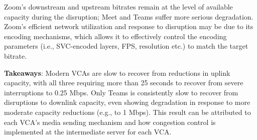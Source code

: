 Zoom's downstream and upstream bitrates remain at the level of available
capacity during the disruption; Meet and Teams suffer more
serious degradation. Zoom's efficient network utilization and response to
disruption may be due to its encoding mechanisms, which allows it to  
effectively control the encoding parameters (i.e., SVC-encoded layers, FPS,
resolution etc.) to match the target bitrate.  
\vspace{5pt}
\begin{mdframed}[roundcorner=5pt, backgroundcolor=black!10] \noindent
    \textbf{Takeaways}: Modern VCAs are slow to recover from reductions in uplink 
    capacity, with all three requiring more than 25 seconds to recover from severe
    interruptions to 0.25 Mbps. Only Teams is consistently slow to recover
    from disruptions to downlink capacity, even showing degradation in
    response to more moderate capacity reductions (e.g., to 1 Mbps).
    This result can be attributed to each VCA's media sending mechanism and how
    congestion control is implemented at the intermediate server for each VCA. 
\end{mdframed}


